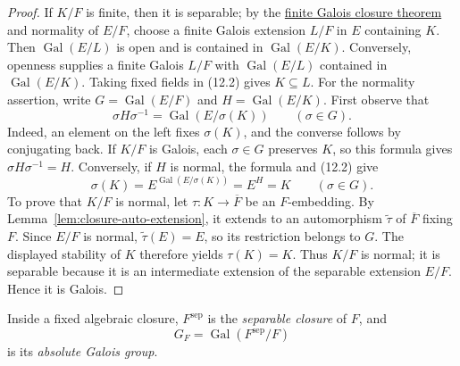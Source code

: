 \begin{proof}
If \(K/F\) is finite, then it is separable; by the
\hyperref[thm:finite-galois-closure]{finite Galois closure theorem} and
normality of \(E/F\), choose a finite Galois extension \(L/F\) in \(E\)
containing \(K\).
Then \(\operatorname{Gal}(E/L)\) is open and is contained in
\(\operatorname{Gal}(E/K)\).  Conversely, openness supplies a finite Galois
\(L/F\) with \(\operatorname{Gal}(E/L)\) contained in
\(\operatorname{Gal}(E/K)\).  Taking fixed fields in (12.2) gives
\(K\subseteq L\).
For the normality assertion, write \(G=\operatorname{Gal}(E/F)\) and
\(H=\operatorname{Gal}(E/K)\).  First observe that
\[
\sigma H\sigma^{-1}=\operatorname{Gal}(E/\sigma(K))
\qquad(\sigma\in G).
\]
Indeed, an element on the left fixes \(\sigma(K)\), and the converse follows
by conjugating back.  If \(K/F\) is Galois, each \(\sigma\in G\) preserves
\(K\), so this formula gives \(\sigma H\sigma^{-1}=H\).  Conversely, if
\(H\) is normal, the formula and (12.2) give
\[
\sigma(K)=E^{\operatorname{Gal}(E/\sigma(K))}=E^H=K
\qquad(\sigma\in G).
\]
To prove that \(K/F\) is normal, let \(\tau:K\to\overline F\) be an
\(F\)-embedding.  By Lemma~\ref{lem:closure-auto-extension}, it extends to
an automorphism \(\widetilde\tau\) of \(\overline F\) fixing \(F\).  Since
\(E/F\) is normal, \(\widetilde\tau(E)=E\), so its restriction belongs to \(G\).
The displayed stability of \(K\) therefore yields \(\tau(K)=K\).  Thus
\(K/F\) is normal; it is separable because it is an intermediate extension
of the separable extension \(E/F\).  Hence it is Galois.
\end{proof}

\begin{definition}
Inside a fixed algebraic closure, \(F^{\mathrm{sep}}\) is the
\emph{separable closure} of \(F\), and
\[
G_F=\operatorname{Gal}(F^{\mathrm{sep}}/F)
\]
is its \emph{absolute Galois group}.
\end{definition}

